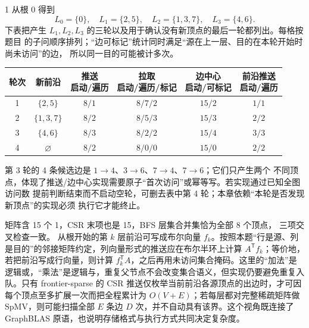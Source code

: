 \begin{solutionexercise}{1}
从根 0 得到
\[
L_0=\{0\},\quad L_1=\{2,5\},\quad
L_2=\{1,3,7\},\quad L_3=\{4,6\}.
\]
下表把产生 $L_1,L_2,L_3$ 的三轮以及用于确认没有新顶点的最后一轮都列出。每格按题目
的子问顺序排列；“边可标记”统计同时满足“源在上一层、目的在本轮开始时尚未访问”的边，
所以同一目的可能被计多次。
\begin{center}
\small
\setlength{\tabcolsep}{3.5pt}
\begin{tabular}{c|c|c|c|c|c}
\toprule
轮次 & 新前沿 & \shortstack{推送\\启动/遍历} &
\shortstack{拉取\\启动/遍历/标记} & \shortstack{边中心\\启动/可标记} &
\shortstack{前沿推送\\启动/遍历}\\
\midrule
1 & $\{2,5\}$ & $8/1$ & $8/7/2$ & $15/2$ & $1/1$\\
2 & $\{1,3,7\}$ & $8/2$ & $8/5/3$ & $15/3$ & $2/2$\\
3 & $\{4,6\}$ & $8/3$ & $8/2/2$ & $15/4$ & $3/3$\\
4 & $\varnothing$ & $8/2$ & $8/0/0$ & $15/0$ & $2/2$\\
\bottomrule
\end{tabular}
\end{center}
第 3 轮的 4 条候选边是 $1\to4$、$3\to6$、$7\to4$、$7\to6$；它们只产生两个
不同顶点，体现了推送/边中心实现需要原子“首次访问”或幂等写。若实现通过已知全图访问数
提前判断结束而不启动空轮，可删去表中第 4 轮；本章依赖“本轮是否发现新顶点”的实现必须
执行它才能终止。

\conclusionheading 矩阵含 15 个 1，CSR 末项也是 15，BFS 层集合并集恰为全部 8 个顶点，
三项交叉检查一致。
\discussionheading
{}
从根开始的第 $k$ 层前沿可写成布尔向量 $f_k$。按照本题“行是源、列是目的”的邻接矩阵约定，列向量形式的推送应在布尔半环上计算 $A^{\mathsf T}f_k$；等价地，若把前沿写成行向量，则计算 $f_k^{\mathsf T}A$，之后再用未访问集合掩码。这里的“加法”是逻辑或，“乘法”是逻辑与，重复父节点不会改变集合语义，但实现仍要避免重复入队。只有 frontier-sparse 的 CSR 推送仅枚举当前前沿各源顶点的出边时，才可因每个顶点至多扩展一次而把全程累计为 $O(V+E)$；若每层都对完整稀疏矩阵做 SpMV，则可能扫描全部 $E$ 条边 $D$ 次，并不自动具有该界。这个视角既连接了 GraphBLAS 原语，也说明存储格式与执行方式共同决定复杂度。


\end{solutionexercise}
